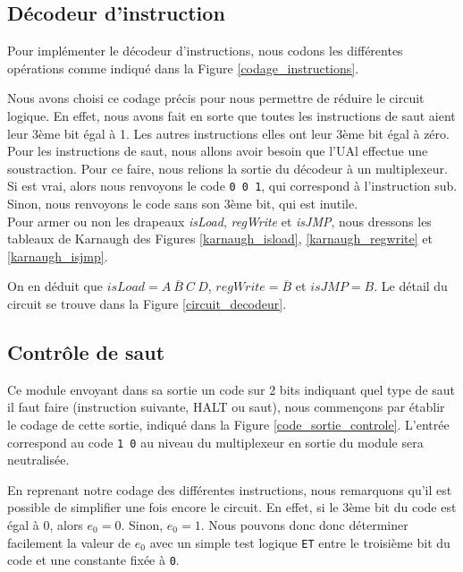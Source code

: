 \documentclass[10pt,a4paper]{article}
\begin{document}
\subsection{Décodeur d'instruction}

Pour implémenter le décodeur d'instructions, nous codons les différentes opérations comme indiqué dans la Figure \ref{codage_instructions}.

Nous avons choisi ce codage précis pour nous permettre de réduire le circuit logique. En effet, nous avons fait en sorte que toutes les instructions de saut aient leur 3ème bit égal à 1. Les autres instructions elles ont leur 3ème bit égal à zéro. \\

Pour les instructions de saut, nous allons avoir besoin que l'UAl effectue une soustraction. Pour ce faire, nous relions la sortie du décodeur à un multiplexeur. Si  est vrai, alors nous renvoyons le code \verb|0 0 1|, qui correspond à l'instruction sub. Sinon, nous renvoyons le code sans son 3ème bit, qui est inutile. \\

Pour armer ou non les drapeaux \textit{isLoad}, \textit{regWrite} et \textit{isJMP}, nous dressons les tableaux de Karnaugh des Figures \ref{karnaugh_isload}, \ref{karnaugh_regwrite} et \ref{karnaugh_isjmp}.

On en déduit que $isLoad = A~\overline{B}~C~D$, $regWrite = \overline{B}$ et $isJMP = B$. Le détail du circuit se trouve dans la Figure \ref{circuit_decodeur}. \newpage

\subsection{Contrôle de saut}

Ce module envoyant dans sa sortie un code sur 2 bits indiquant quel type de saut il faut faire (instruction suivante, HALT ou saut), nous commençons par établir le codage de cette sortie, indiqué dans la Figure \ref{code_sortie_controle}. L'entrée correspond au code \verb|1 0| au niveau du multiplexeur en sortie du module sera neutralisée.

En reprenant notre codage des différentes instructions, nous remarquons qu'il est possible de simplifier une fois encore le circuit. En effet, si le 3ème bit du code est égal à 0, alors $e_0 = 0$. Sinon, $e_0 = 1$. Nous pouvons donc donc déterminer facilement la valeur de $e_0$ avec un simple test logique \verb|ET| entre le troisième bit du code et une constante fixée à \verb|0|. \\
\end{document}
